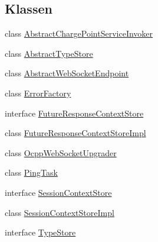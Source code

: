 \subsection*{Klassen}
\begin{DoxyCompactItemize}
\item 
class \hyperlink{classde_1_1rwth_1_1idsg_1_1steve_1_1ocpp_1_1ws_1_1_abstract_charge_point_service_invoker}{Abstract\+Charge\+Point\+Service\+Invoker}
\item 
class \hyperlink{classde_1_1rwth_1_1idsg_1_1steve_1_1ocpp_1_1ws_1_1_abstract_type_store}{Abstract\+Type\+Store}
\item 
class \hyperlink{classde_1_1rwth_1_1idsg_1_1steve_1_1ocpp_1_1ws_1_1_abstract_web_socket_endpoint}{Abstract\+Web\+Socket\+Endpoint}
\item 
class \hyperlink{classde_1_1rwth_1_1idsg_1_1steve_1_1ocpp_1_1ws_1_1_error_factory}{Error\+Factory}
\item 
interface \hyperlink{interfacede_1_1rwth_1_1idsg_1_1steve_1_1ocpp_1_1ws_1_1_future_response_context_store}{Future\+Response\+Context\+Store}
\item 
class \hyperlink{classde_1_1rwth_1_1idsg_1_1steve_1_1ocpp_1_1ws_1_1_future_response_context_store_impl}{Future\+Response\+Context\+Store\+Impl}
\item 
class \hyperlink{classde_1_1rwth_1_1idsg_1_1steve_1_1ocpp_1_1ws_1_1_ocpp_web_socket_upgrader}{Ocpp\+Web\+Socket\+Upgrader}
\item 
class \hyperlink{classde_1_1rwth_1_1idsg_1_1steve_1_1ocpp_1_1ws_1_1_ping_task}{Ping\+Task}
\item 
interface \hyperlink{interfacede_1_1rwth_1_1idsg_1_1steve_1_1ocpp_1_1ws_1_1_session_context_store}{Session\+Context\+Store}
\item 
class \hyperlink{classde_1_1rwth_1_1idsg_1_1steve_1_1ocpp_1_1ws_1_1_session_context_store_impl}{Session\+Context\+Store\+Impl}
\item 
interface \hyperlink{interfacede_1_1rwth_1_1idsg_1_1steve_1_1ocpp_1_1ws_1_1_type_store}{Type\+Store}
\end{DoxyCompactItemize}
